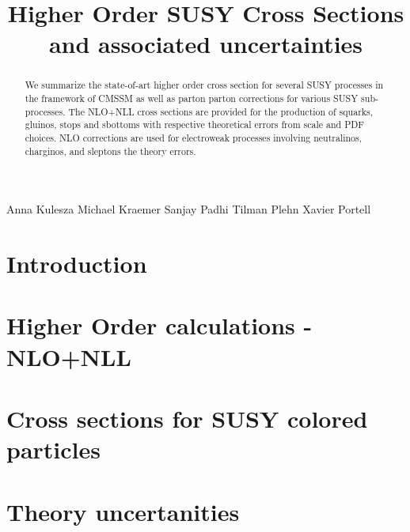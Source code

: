 \documentclass{cmspaper}
\begin{document}
%
\begin{titlepage}
\title{Higher Order SUSY Cross Sections and associated uncertainties}

  \begin{Authlist}
  Anna Kulesza
 Michael Kraemer
Sanjay Padhi
Tilman Plehn
Xavier Portell 

 \end{Authlist}

\begin{abstract}
We summarize the state-of-art higher order cross section for several SUSY processes in the framework of CMSSM as well as parton parton corrections for 
various SUSY sub-processes. The NLO+NLL cross sections are provided for the production of squarks, gluinos, stops and sbottoms with respective theoretical 
errors from scale and PDF choices. NLO corrections are used for electroweak processes involving neutralinos, charginos, and sleptons the theory errors. 

\end{abstract}
\end{titlepage}

\clearpage
\section{Introduction}

\section{Higher Order calculations - NLO+NLL}

\section{Cross sections for SUSY colored particles}

\section{Theory uncertanities}



\appendix
\end{document}
